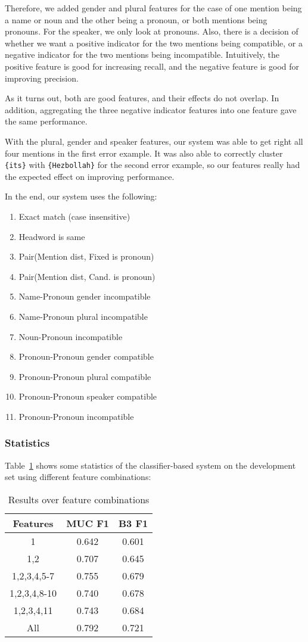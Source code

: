 \documentclass[12pt, twocolumn]{article}
\begin{document}
Therefore, we added gender and plural features for the case of one mention being a name or noun and the other being a pronoun, or both mentions being pronouns. For the speaker, we only look at pronouns. Also, there is a decision of whether we want a positive indicator for the two mentions being compatible, or a negative indicator for the two mentions being incompatible. Intuitively, the positive feature is good for increasing recall, and the negative feature is good for improving precision.

As it turns out, both are good features, and their effects do not overlap. In addition, aggregating the three negative indicator features into one feature gave the same performance.

With the plural, gender and speaker features, our system was able to get right all four mentions in the first error example.
It was also able to correctly cluster \texttt{\{its\}} with \texttt{\{Hezbollah\}} for the second error example, so our features really had the expected effect on improving performance.

In the end, our system uses the following:
\begin{enumerate}[(1)]
\item Exact match (case insensitive)
\item Headword is same
\item Pair(Mention dist, Fixed is pronoun) 
\item Pair(Mention dist, Cand. is pronoun) 
\item Name-Pronoun gender incompatible
\item Name-Pronoun plural incompatible
\item Noun-Pronoun incompatible
\item Pronoun-Pronoun gender compatible
\item Pronoun-Pronoun plural compatible
\item Pronoun-Pronoun speaker compatible
\item Pronoun-Pronoun incompatible
\end{enumerate}
\subsubsection{Statistics}
Table~\ref{tab:features} shows some statistics of the classifier-based system on the development set using different feature combinations:
\begin{table}[H]
\begin{center}
\begin{tabular}{|c|c|c|}
\hline
Features & MUC F1 & B3 F1\\\hline
1 & 0.642 & 0.601 \\\hline
1,2 & 0.707 & 0.645 \\\hline
1,2,3,4,5-7 & 0.755 & 0.679\\\hline
1,2,3,4,8-10 & 0.740 & 0.678\\\hline
1,2,3,4,11 & 0.743 & 0.684 \\\hline
All & 0.792 & 0.721 \\\hline
\end{tabular}
\end{center}
\caption{Results over feature combinations}
\label{tab:features}
\end{table}
\end{document}
